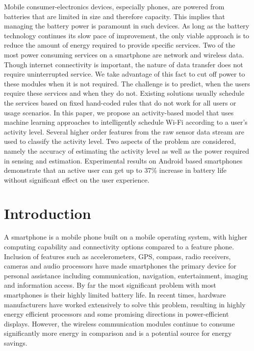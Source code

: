 

Mobile consumer-electronics devices, especially phones, are powered from batteries that are limited in size and therefore capacity. This implies that managing the battery power is paramount in such devices. As long as the battery technology continues its slow pace of improvement, the only viable approach is to reduce the amount of energy required to provide specific services. Two of the most power consuming services on a smartphone are network and wireless data. Though internet connectivity is important, the nature of data transfer does not require uninterrupted service. We take advantage of this fact to cut off power to these modules when it is not required. The challenge is to predict, when the users require these services and when they do not. Existing solutions usually schedule the services based on fixed hand-coded rules that do not work for all users or usage scenarios.  In this paper, we propose an activity-based model that uses machine learning approaches to intelligently schedule Wi-Fi according to a user's activity level. Several higher order features from the raw sensor data stream are used to classify the activity level. Two aspects of the problem are considered, namely the accuracy of estimating the activity level as well as the power required in sensing and estimation. Experimental results on Android based smartphones demonstrate that an active user can get up to 37\% increase in battery life without significant effect on the user experience.

\section{Introduction}
A smartphone is a mobile phone built on a mobile operating system, with higher computing capability
and connectivity options compared to a feature phone. Inclusion of features such as accelerometers,
GPS, compass, radio receivers, cameras and audio processors have made smartphones the primary
device for personal assistance including communication, navigation, entertainment, imaging and
information access. By far the most significant
problem with most smartphones is their highly limited battery life. In recent times, hardware
manufacturers have worked extensively to solve this problem, resulting in highly energy efficient
processors and some promising directions in power-efficient displays. However, the wireless communication modules continue to consume significantly more energy in comparison and is a potential  source for energy savings. 

